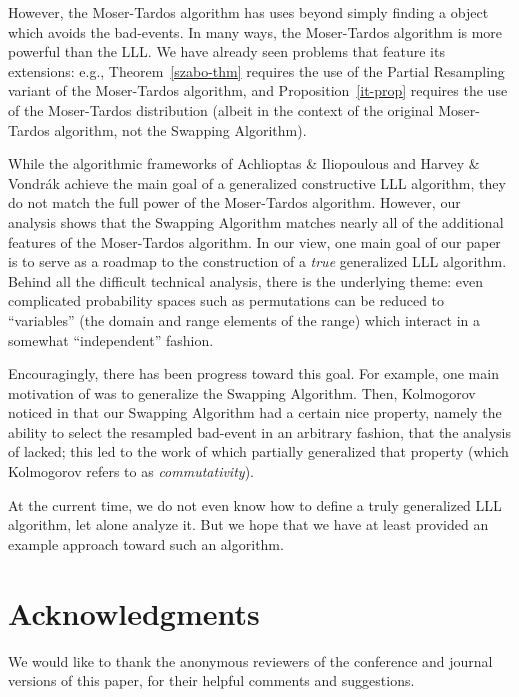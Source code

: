 However, the Moser-Tardos algorithm has uses beyond simply finding a object which avoids the bad-events. In many ways, the Moser-Tardos algorithm is more powerful than the LLL. We have already seen problems that feature its extensions: e.g., Theorem~\ref{szabo-thm} requires the use of the Partial Resampling variant of the Moser-Tardos algorithm, and Proposition~\ref{it-prop} requires the use of the Moser-Tardos distribution (albeit in the context of the original Moser-Tardos algorithm, not the Swapping Algorithm). 

While the algorithmic frameworks of Achlioptas \& Iliopoulous and Harvey \& Vondr\'{a}k achieve the main goal of a generalized constructive LLL algorithm, they do not match the full power of the Moser-Tardos algorithm. However, our analysis shows that the Swapping Algorithm matches nearly all of the additional features of the Moser-Tardos algorithm. In our view, one main goal of our paper is to serve as a roadmap to the construction of a \emph{true} generalized LLL algorithm. Behind all the difficult technical analysis, there is the underlying theme: even complicated probability spaces such as permutations can be reduced to ``variables'' (the domain and range elements of the range) which interact in a somewhat ``independent'' fashion. 

Encouragingly, there has been progress toward this goal. For example, one main motivation of \cite{achlioptas,harvey} was to generalize the Swapping Algorithm. Then, Kolmogorov noticed in \cite{kolmogorov} that our Swapping Algorithm had a certain nice property, namely the ability to select the resampled bad-event in an arbitrary fashion, that the analysis of \cite{achlioptas} lacked; this led to the work of \cite{kolmogorov} which partially generalized that property (which Kolmogorov refers to as \emph{commutativity}).

At the current time, we do not even know how to define a truly generalized LLL algorithm, let alone analyze it. But we hope that we have at least provided an example approach toward such an algorithm. 


\section{Acknowledgments}
We would like to thank the anonymous reviewers of the conference and journal versions of this paper, for their helpful comments and suggestions.

\appendix


